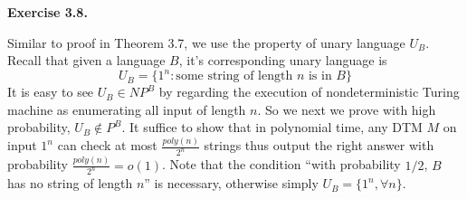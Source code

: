 \documentclass[a4paper]{article}
\newenvironment{exercise}[1]{
	\par
	\noindent\textbf{Exercise #1.}\quad
}{
	\par
	\bigskip
}
\begin{document}
\begin{exercise}{3.8}
    Similar to proof in Theorem 3.7, we use the property of unary language $U_B$. 
    Recall that given a language $B$, it's corresponding unary language is
    $$
    U_B=\{1^n: \text{some string of length $n$ is in $B$}\}
    $$
    It is easy to see $U_B\in NP^B$ by regarding the execution of nondeterministic Turing machine as enumerating all input of length $n$. So we next we prove with high probability, $U_B\not\in P^B$. 
    It suffice to show that in polynomial time, any DTM $M$ on input $1^n$ can check at most $\frac{poly(n)}{2^n}$ strings thus output the right answer with probability $\frac{poly(n)}{2^n}=o(1)$. 
    Note that the condition ``with probability $1/2$, $B$ has no string of length $n$'' is necessary, otherwise simply $U_B=\{1^n, \forall n\}$.

 

\end{exercise}
\end{document}
